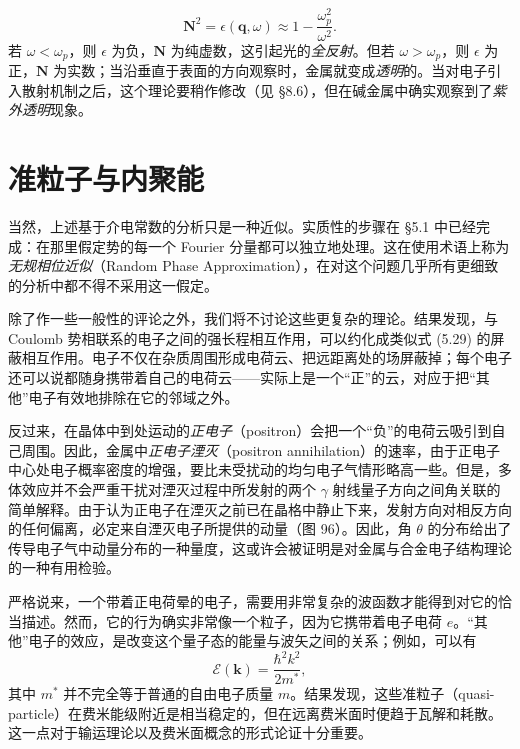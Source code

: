 \begin{equation*}
\mathbf{N}^{2}=\epsilon(\mathbf{q},\omega)\approx 1-\frac{\omega_{p}^{2}}{\omega^{2}}. \tag{5.67}
\end{equation*}
若 $\omega<\omega_{p}$，则 $\epsilon$ 为负，$\mathbf{N}$ 为纯虚数，这引起光的\emph{全反射}。但若 $\omega>\omega_{p}$，则 $\epsilon$ 为正，$\mathbf{N}$ 为实数；当沿垂直于表面的方向观察时，金属就变成\emph{透明}的。当对电子引入散射机制之后，这个理论要稍作修改（见 §8.6），但在碱金属中确实观察到了\emph{紫外透明}现象。

\section{准粒子与内聚能}

当然，上述基于介电常数的分析只是一种近似。实质性的步骤在 §5.1 中已经完成：在那里假定势的每一个 Fourier 分量都可以独立地处理。这在使用术语上称为\emph{无规相位近似}（Random Phase Approximation），在对这个问题几乎所有更细致的分析中都不得不采用这一假定。

除了作一些一般性的评论之外，我们将不讨论这些更复杂的理论。结果发现，与 Coulomb 势相联系的电子之间的强长程相互作用，可以约化成类似式 (5.29) 的屏蔽相互作用。电子不仅在杂质周围形成电荷云、把远距离处的场屏蔽掉；每个电子还可以说都随身携带着自己的电荷云——实际上是一个“正”的云，对应于把“其他”电子有效地排除在它的邻域之外。

反过来，在晶体中到处运动的\emph{正电子}（positron）会把一个“负”的电荷云吸引到自己周围。因此，金属中\emph{正电子湮灭}（positron annihilation）的速率，由于正电子中心处电子概率密度的增强，要比未受扰动的均匀电子气情形略高一些。但是，多体效应并不会严重干扰对湮灭过程中所发射的两个 $\gamma$ 射线量子方向之间角关联的简单解释。由于认为正电子在湮灭之前已在晶格中静止下来，发射方向对相反方向的任何偏离，必定来自湮灭电子所提供的动量（图 96）。因此，角 $\theta$ 的分布给出了传导电子气中动量分布的一种量度，这或许会被证明是对金属与合金电子结构理论的一种有用检验。


严格说来，一个带着正电荷晕的电子，需要用非常复杂的波函数才能得到对它的恰当描述。然而，它的行为确实非常像一个粒子，因为它携带着电子电荷 $e$。“其他”电子的效应，是改变这个量子态的能量与波矢之间的关系；例如，可以有
\begin{equation*}
\mathcal{E}(\mathbf{k})=\frac{\hbar^{2}k^{2}}{2m^{*}}, \tag{5.68}
\end{equation*}
其中 $m^{*}$ 并不完全等于普通的自由电子质量 $m$。结果发现，这些准粒子（quasi-particle）在费米能级附近是相当稳定的，但在远离费米面时便趋于瓦解和耗散。这一点对于输运理论以及费米面概念的形式论证十分重要。

